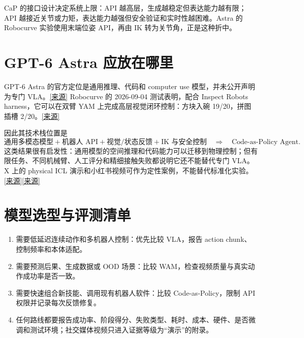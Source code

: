 \documentclass[UTF8,a4paper,11pt]{ctexart}
\newcommand{\source}[1]{\href{#1}{[来源]}}
\begin{document}
CaP 的接口设计决定系统上限：API 越高层，生成越稳定但表达能力越有限；API 越接近关节或力矩，表达能力越强但安全验证和实时性越困难。Astra 的 Robocurve 实验使用末端位姿 API，再由 IK 转为关节角，正是这种折中。

\section{GPT-6 Astra 应放在哪里}
GPT-6 Astra 的官方定位是通用推理、代码和 computer use 模型，并未公开声明为专门 VLA。\source{https://openai.com/index/gpt-6-astra/} Robocurve 的 2026-09-04 测试表明，配合 Inspect Robots harness，它可以在双臂 YAM 上完成高层视觉闭环控制：方块入碗 19/20，拼图插槽 2/20。\source{https://openai.robocurve.org/gpt-6-astra/}

因此其技术栈位置是
\[
 \text{通用多模态模型}
 +\text{机器人 API}
 +\text{视觉/状态反馈}
 +\text{IK 与安全控制}
 \quad\Rightarrow\quad
 \text{Code-as-Policy Agent}.
\]
这类结果很有启发性：通用模型的空间推理和代码能力可以迁移到物理控制；但有限任务、不同机械臂、人工评分和精细接触失败都说明它还不能替代专门 VLA。X 上的 physical ICL 演示和小红书视频可作为定性案例，不能替代标准化实验。\source{https://www.sotwe.com/npew?lang=en}\;\source{https://www.yicai.com/news/103359498.html}

\section{模型选型与评测清单}
\begin{enumerate}
\item 需要低延迟连续动作和多机器人控制：优先比较 VLA，报告 action chunk、控制频率和本体适配。
\item 需要预测后果、生成数据或 OOD 场景：比较 WAM，检查视频质量与真实动作成功率是否一致。
\item 需要快速组合新技能、调用现有机器人软件：比较 Code-as-Policy，限制 API 权限并记录每次反馈修复。
\item 任何路线都要报告成功率、阶段得分、失败类型、耗时、成本、硬件、是否微调和测试环境；社交媒体视频只进入证据等级为“演示”的附录。
\end{enumerate}


\end{document}
